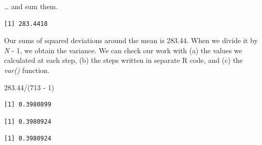 \documentclass[
  11pt,
]{book}
\newenvironment{Shaded}{\begin{snugshade}}{\end{snugshade}}
\newcommand{\AttributeTok}[1]{\textcolor[rgb]{0.77,0.63,0.00}{#1}}
\newcommand{\CommentTok}[1]{\textcolor[rgb]{0.56,0.35,0.01}{\textit{#1}}}
\newcommand{\ConstantTok}[1]{\textcolor[rgb]{0.00,0.00,0.00}{#1}}
\newcommand{\DecValTok}[1]{\textcolor[rgb]{0.00,0.00,0.81}{#1}}
\newcommand{\FloatTok}[1]{\textcolor[rgb]{0.00,0.00,0.81}{#1}}
\newcommand{\FunctionTok}[1]{\textcolor[rgb]{0.00,0.00,0.00}{#1}}
\newcommand{\NormalTok}[1]{#1}
\newcommand{\SpecialCharTok}[1]{\textcolor[rgb]{0.00,0.00,0.00}{#1}}
\begin{document}
\ldots{} and sum them.

\begin{Shaded}
\end{Shaded}

\begin{verbatim}
[1] 283.4418
\end{verbatim}

Our sums of squared deviations around the mean is 283.44. When we divide it by \emph{N} - 1, we obtain the variance. We can check our work with (a) the values we calculated at each step, (b) the steps written in separate R code, and (c) the \emph{var()} function.

\begin{Shaded}
\begin{Highlighting}[]
\FloatTok{283.44}\SpecialCharTok{/}\NormalTok{(}\DecValTok{713} \SpecialCharTok{{-}} \DecValTok{1}\NormalTok{)}
\end{Highlighting}
\end{Shaded}

\begin{verbatim}
[1] 0.3980899
\end{verbatim}

\begin{Shaded}
\end{Shaded}

\begin{verbatim}
[1] 0.3980924
\end{verbatim}

\begin{Shaded}
\end{Shaded}

\begin{verbatim}
[1] 0.3980924
\end{verbatim}
\end{document}
